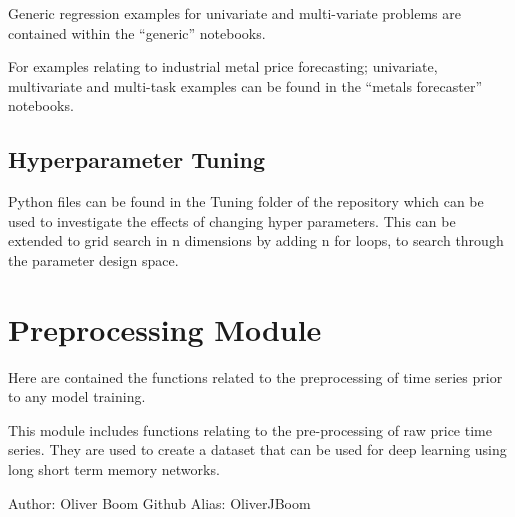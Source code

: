 \documentclass[letterpaper,10pt,english]{sphinxmanual}
\begin{document}
Generic regression examples for univariate and multi-variate problems are contained within the “generic” notebooks.

For examples relating to industrial metal price forecasting; univariate, multivariate and multi-task examples can be found in the “metals forecaster” notebooks.


\subsection{Hyperparameter Tuning}
\label{\detokenize{intro:hyperparameter-tuning}}
Python files can be found in the Tuning folder of the repository which can be used to investigate the effects of changing hyper parameters. This can be extended to grid search in n dimensions by adding n for loops, to search through the parameter design space.


\section{Preprocessing Module}
\label{\detokenize{preprocessing:preprocessing-module}}\label{\detokenize{preprocessing::doc}}
Here are contained the functions related to the preprocessing of time series prior to any model training.

\label{\detokenize{preprocessing:module-Foresight.preprocessing}}
This module includes functions relating to the pre-processing of raw price
time series. They are used to create a dataset that can be used for deep
learning using long short term memory networks.

Author: Oliver Boom
Github Alias: OliverJBoom
\end{document}
